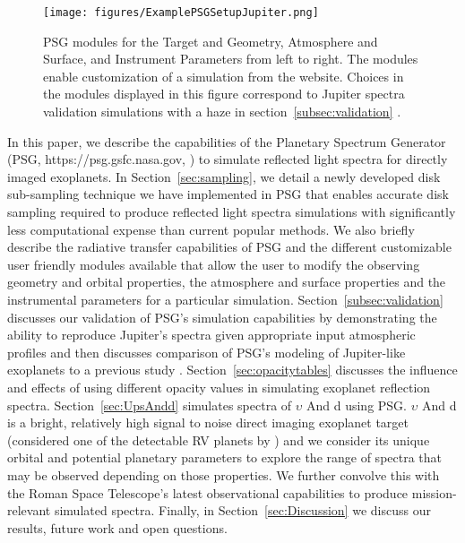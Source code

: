 \documentclass[12pt, letterpaper]{aastex631}
\begin{document}
\begin{figure*}[b]
  \centering
  \texttt{[image: figures/ExamplePSGSetupJupiter.png]}
  \caption{PSG modules for the Target and Geometry, Atmosphere and Surface, and Instrument Parameters from left to right.  The modules enable customization of a simulation from the website.  Choices in the modules displayed in this figure correspond to Jupiter spectra validation simulations with a haze in section~\ref{subsec:validation} .}
  \label{fig:KarkSetup}
\end{figure*}

In this paper, we describe the capabilities of the Planetary Spectrum Generator (PSG, https://psg.gsfc.nasa.gov, \textcite{2018JQSRT.217...86V}) to simulate reflected light spectra for directly imaged exoplanets.  In Section~\ref{sec:sampling}, we detail a newly developed disk sub-sampling technique we have implemented in PSG that enables accurate disk sampling required to produce reflected light spectra simulations with significantly less computational expense than current popular methods.  We also briefly describe the radiative transfer capabilities of PSG and the different customizable user friendly modules available that allow the user to modify the observing geometry and orbital properties, the atmosphere and surface properties and the instrumental parameters for a particular simulation.   Section~\ref{subsec:validation} discusses our validation of PSG's simulation capabilities by demonstrating the ability to reproduce Jupiter's spectra given appropriate input atmospheric profiles and then discusses comparison of PSG's modeling of Jupiter-like exoplanets to a previous study \citep{2018ApJ...858...69M}.  Section~\ref{sec:opacitytables} discusses the influence and effects of using different opacity values in simulating exoplanet reflection spectra.  Section~\ref{sec:UpsAndd} simulates spectra of $\upsilon$ And d using PSG.  $\upsilon$ And d is a bright, relatively high signal to noise direct imaging exoplanet target (considered one of the detectable RV planets by \textcite{2015arXiv150303757S}) and we consider its unique orbital and potential planetary parameters to explore the range of spectra that may be observed depending on those properties.  We further convolve this with the Roman Space Telescope's latest observational capabilities to produce mission-relevant simulated spectra. Finally, in Section~\ref{sec:Discussion} we discuss our results, future work and open questions.  

\end{document}
